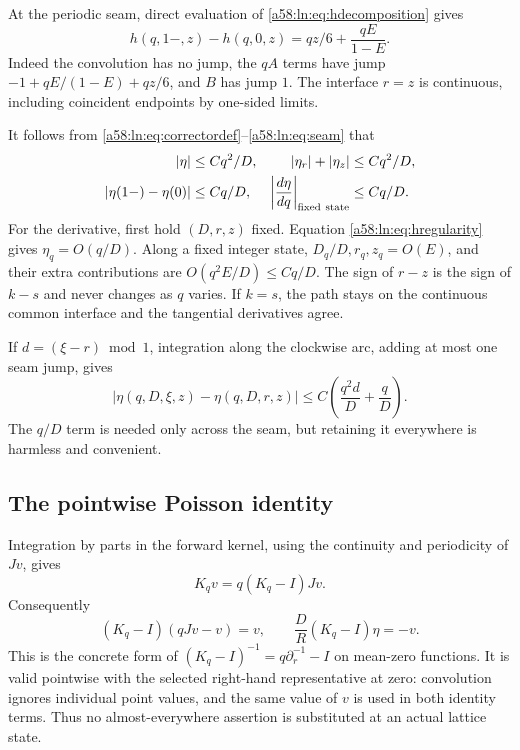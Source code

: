 \documentclass[11pt,letterpaper]{article}
\theoremstyle{remark}
\begin{document}
At the periodic seam, direct evaluation of \eqref{a58:ln:eq:hdecomposition}
gives
\begin{equation}\label{a58:ln:eq:seam}
 h(q,1-,z)-h(q,0,z)=qz/6+\frac{qE}{1-E}.
\end{equation}
Indeed the convolution has no jump, the $qA$ terms have jump
$-1+qE/(1-E)+qz/6$, and $B$ has jump $1$. The interface $r=z$ is
continuous, including coincident endpoints by one-sided limits.

It follows from \eqref{a58:ln:eq:correctordef}--\eqref{a58:ln:eq:seam} that
\begin{align}
 |\eta|&\le Cq^2/D,& |\eta_r|+|\eta_z|&\le Cq^2/D,\notag\\
 |\eta(1-)-\eta(0)|&\le Cq/D,&
 \left|\frac{d\eta}{dq}\right|_{\rm fixed\ state}&\le Cq/D.
 \label{a58:ln:eq:etabounds}
\end{align}
For the derivative, first hold $(D,r,z)$ fixed. Equation
\eqref{a58:ln:eq:hregularity} gives $\eta_q=O(q/D)$. Along a fixed integer
state, $D_q/D,r_q,z_q=O(E)$, and their extra contributions are
$O(q^2E/D)\le Cq/D$. The sign of $r-z$ is the sign of $k-s$ and never
changes as $q$ varies. If $k=s$, the path stays on the continuous common
interface and the tangential derivatives agree.

If $d=(\xi-r)\bmod1$, integration along the clockwise arc, adding at
most one seam jump, gives
\begin{equation}\label{a58:ln:eq:etaincrement}
 |\eta(q,D,\xi,z)-\eta(q,D,r,z)|
 \le C\left(\frac{q^2d}D+\frac qD\right).
\end{equation}
The $q/D$ term is needed only across the seam, but retaining it everywhere
is harmless and convenient.

\subsection{The pointwise Poisson identity}
Integration by parts in the forward kernel, using the continuity and
periodicity of $Jv$, gives
\[
 K_qv=q(K_q-I)Jv.
\]
Consequently
\begin{equation}\label{a58:ln:eq:poisson}
 (K_q-I)(qJv-v)=v,\qquad
 \frac DR(K_q-I)\eta=-v.
\end{equation}
This is the concrete form of $(K_q-I)^{-1}=q\partial_r^{-1}-I$ on
mean-zero functions. It is valid pointwise with the selected right-hand
representative at zero: convolution ignores individual point values,
and the same value of $v$ is used in both identity terms. Thus no
almost-everywhere assertion is substituted at an actual lattice state.
\end{document}
